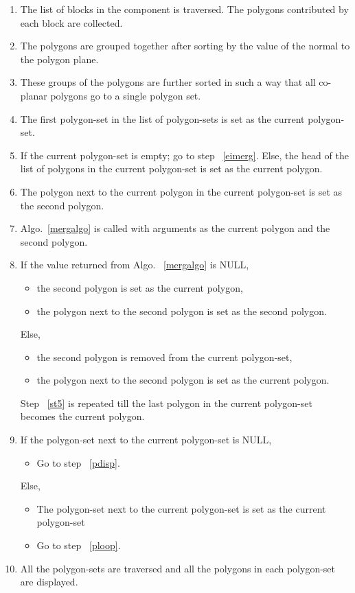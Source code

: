 	\begin{enumerate}
	\item
	The list of blocks in the component is traversed. The polygons
	contributed by each block are collected.

	\item
	The polygons are grouped together after sorting by the value of the normal
	to the polygon plane.
	
	\item

	These groups of the polygons are further sorted in such a way that all 
	co-planar polygons go to a single polygon set.

	\item
	The first polygon-set in the list of polygon-sets is set as the current
	polygon-set.

	\item
	\label{ploop}
	If the current polygon-set is empty; go to step ~\ref{eimerg}.
	Else, the head of the list of polygons in the current polygon-set is set
	as the current polygon. 

	\item
	The polygon next to the current polygon in the current polygon-set is set
	as the second polygon. 
	\item
	\label{st5}
	Algo.~\ref{mergalgo} is called with arguments as the current polygon and
	the second polygon.

	\item
	If the value returned from Algo. ~\ref{mergalgo} is NULL,
		\begin{itemize}
		\item
			the second polygon is set as the current polygon,
		\item
			the polygon next to the second polygon is set as the second polygon.
		\end{itemize}
	Else, 
		\begin{itemize}
		\item
			the second polygon is removed from the current polygon-set,
		\item
			the polygon next to the second polygon is set as the current 					polygon.
		\end{itemize}
	Step ~\ref{st5} is repeated till the last polygon in the current polygon-set
	becomes the current polygon.

	\item
	\label{eimerg}
	If the polygon-set next to the current polygon-set is NULL,
	\begin{itemize}
	\item
	Go to step ~\ref{pdisp}.
	\end{itemize}
	Else, 
	\begin{itemize}
	\item
	The polygon-set next to the current polygon-set is set as the current
	polygon-set
	\item
	Go to step ~\ref{ploop}.
	\end{itemize}

	\item
	\label{pdisp} 
	All the polygon-sets are traversed and all the polygons in each
	polygon-set are displayed.

	\end{enumerate}

